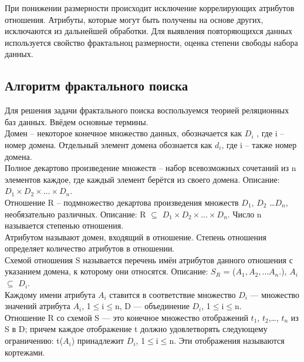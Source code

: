 При понижении размерности происходит исключение коррелирующих атрибутов отношения. Атрибуты, которые могут быть получены на основе других, исключаются из дальнейшей обработки. Для выявления повторяющихся данных используется свойство фрактальноц размерности, оценка степени свободы набора данных. 

\pagebreak

\subsection{Алгоритм фрактального поиска}

Для решения задачи фрактального поиска воспользуемся теорией реляционных баз данных. Ввёдем  основные термины.
\\

Домен – некоторое конечное множество данных, обозначается как $D_i$ , где i – номер домена. Отдельный элемент домена обознается как $d_i$,  где i – также номер домена.
\\

Полное декартово произведение множеств – набор всевозможных сочетаний из n элементов каждое, где каждый элемент берётся из своего домена. Описание:  $D_1 \times D_2 \times \dots \times D_n$.
\\

Отношение R – подмножество декартова произведения множеств  $D_1$,  $D_2$ \dots  $D_n$, необязательно различных. Описание: R $\subseteq$   $D_1 \times D_2 \times \dots \times D_n$. Число n называется степенью отношения.
\\

Атрибутом называют домен, входящий в отношение. Степень отношения определяет количество атрибутов в отношении. 
\\

Схемой отношения S называется перечень имён атрибутов данного отношения с указанием домена, к которому они относятся. Описание: $S_R$ = ($A_1, A_2, \dots A_n$.), $A_i$ $\subseteq$ $D_i$.
\\

Каждому имени атрибута $A_i$ ставится в соответствие множество $D_i$ — множество значений атрибута $A_i$, 1$\leq$i$\leq$n, D — объединение $D_i$, 1$\leq$i$\leq$n.  
\\

Отношение R со схемой S — это конечное множество отображений {$t_1$, $t_2$,…, $t_n$} из S в D; причем каждое отображение t должно удовлетворять следующему ограничению: t($A_i$) принадлежит $D_i$, 1$\leq$i$\leq$n. Эти отображения называются кортежами. 
\\

